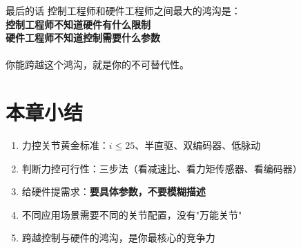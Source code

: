 \begin{engineeringbox}{最后的话}
控制工程师和硬件工程师之间最大的鸿沟是：\\
\textbf{控制工程师不知道硬件有什么限制}\\
\textbf{硬件工程师不知道控制需要什么参数}\\
\\
你能跨越这个鸿沟，就是你的不可替代性。
\end{engineeringbox}

\section*{本章小结}

\begin{summarybox}{}
\begin{enumerate}
  \item 力控关节黄金标准：$i \leq 25$、半直驱、双编码器、低脉动
  \item 判断力控可行性：三步法（看减速比、看力矩传感器、看编码器）
  \item 给硬件提需求：\textbf{要具体参数，不要模糊描述}
  \item 不同应用场景需要不同的关节配置，没有"万能关节"
  \item 跨越控制与硬件的鸿沟，是你最核心的竞争力
\end{enumerate}
\end{summarybox}

\newpage
